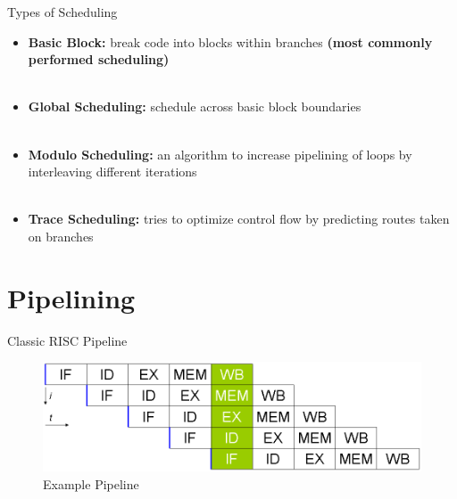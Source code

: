 \documentclass{beamer}
\begin{document}
\begin{darkframes}
\begin{frame}{Types of Scheduling}
\begin{itemize}
	\item {\bf \color{green} Basic Block:} break code into blocks within branches {\bf \color{cyan} (most commonly performed scheduling)} \\
	\qquad \\
	\pause
	\item {\bf \color{green} Global Scheduling:} schedule across basic block boundaries \\
	\qquad \\
	\pause
	\item {\bf \color{green} Modulo Scheduling:} an algorithm to increase pipelining of loops by interleaving different iterations \\
	\qquad \\
	\pause
	\item {\bf \color{green} Trace Scheduling:} tries to optimize control flow by predicting routes taken on branches
\end{itemize}
\end{frame}


\section{Pipelining}
\begin{frame}{Classic RISC Pipeline}
\begin{figure}
\includegraphics[scale=0.4]{figures/pipeline}
\caption{Example Pipeline}
\end{figure}
\end{frame}


\end{darkframes}
\end{document}
